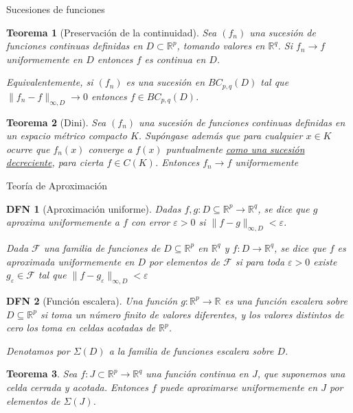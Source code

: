 \documentclass[a4paper]{article}\usepackage{/home/alonso/Documents/Projects/formularios/styles}
\newtheorem{definition}{DFN}
\theoremstyle{mytheoremstyle}
\newtheorem{theorem}{Teorema}
\newcommand{\R}{\mathbb{R}}
\newcommand{\1}{\mathds{1}}
\begin{document}
\begin{multicols*}{3}
\begin{roundbox}{Sucesiones de funciones}
\begin{theorem}[Preservación de la continuidad]
Sea $(f_n)$ una sucesión de funciones continuas definidas en $D\subset\R^{p}$, tomando valores en $\R^{q}$. Si $f_n\to f$ uniformemente en $D$ entonces $f$ es continua en $D$.

Equivalentemente, si $(f_n)$ es una sucesión en $BC_{p,q}(D)$ tal que $\|f_n-f\|_{\infty,D}\to0$ entonces $f\in BC_{p,q}(D)$.
\end{theorem}

\begin{theorem}[Dini]
Sea $(f_n)$ una sucesión de funciones continuas definidas en un espacio métrico compacto $K$. Supóngase además que para cualquier $x\in K$ ocurre que $f_n(x)$ converge a $f(x)$ puntualmente \underline{como una sucesión decreciente}, para cierta $f\in C(K)$. Entonces $f_n\to f$ uniformemente
\end{theorem}
\end{roundbox}

\begin{roundbox}{Teoría de Aproximación}
\begin{definition}[Aproximación uniforme]
    Dadas $f,g:D\subseteq\R^{p}\to\R^{q}$, se dice que $g$ aproxima uniformemente a $f$ con error $\varepsilon>0$ si $\|f-g\|_{\infty,D}<\varepsilon$.

    Dada $\mathcal F$ una familia de funciones de $D\subseteq\R^{p}$ en $\R^{q}$ y $f:D\to\R^{q}$, se dice que $f$ es aproximada uniformemente en $D$ por elementos de $\mathcal F$ si para toda $\varepsilon>0$ existe $g_\varepsilon\in\mathcal F$ tal que $\|f-g_\varepsilon\|_{\infty,D}<\varepsilon$
\end{definition}

\begin{definition}[Función escalera]
    Una función $g: \R^{p} \to \R^{}$ es una función escalera sobre $D \subseteq \R^{p}$ si toma un número finito de valores diferentes, y los valores distintos de cero los toma en celdas acotadas de $\R^{p}$.

    Denotamos por $\Sigma(D)$ a la familia de funciones escalera sobre $D$.
\end{definition}

\begin{theorem}
Sea $f:J\subset\R^{p}\to\R^{q}$ una función continua en $J$, que suponemos una celda cerrada y acotada. Entonces $f$ puede aproximarse uniformemente en $J$ por elementos de $\Sigma(J)$.
\end{theorem}


\end{roundbox}
\end{multicols*}
\end{document}
